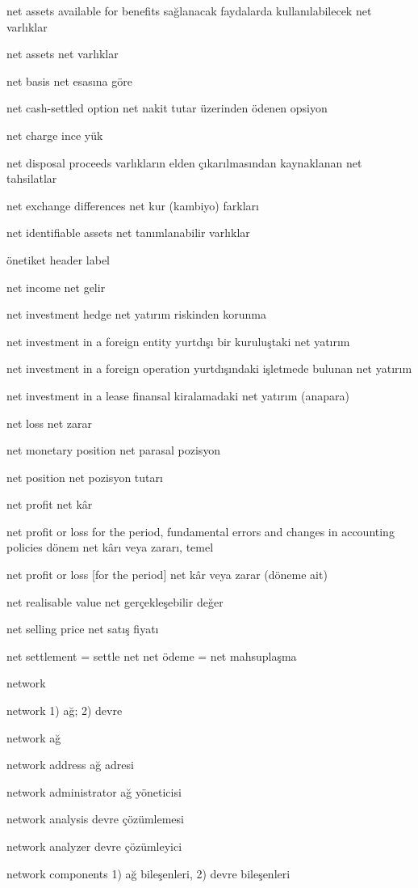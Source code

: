 \documentclass[12pt,fleqn]{article}\usepackage{../../common}
\begin{document}
net assets available for benefits sağlanacak faydalarda kullanılabilecek net varlıklar

net assets net varlıklar

net basis net esasına göre

net cash-settled option net nakit tutar üzerinden ödenen opsiyon

net charge ince yük

net disposal proceeds varlıkların elden çıkarılmasından kaynaklanan net tahsilatlar

net exchange differences net kur (kambiyo) farkları

net identifiable assets net tanımlanabilir varlıklar

önetiket header label

net income net gelir

net investment hedge net yatırım riskinden korunma

net investment in a foreign entity yurtdışı bir kuruluştaki net yatırım

net investment in a foreign operation yurtdışındaki işletmede bulunan net yatırım

net investment in a lease finansal kiralamadaki net yatırım (anapara)

net loss net zarar

net monetary position net parasal pozisyon

net position net pozisyon tutarı

net profit net kâr

net profit or loss for the period, fundamental errors and changes in accounting policies dönem net kârı veya zararı, temel

net profit or loss [for the period] net kâr veya zarar (döneme ait)

net realisable value net gerçekleşebilir değer

net selling price net satış fiyatı

net settlement = settle net net ödeme = net mahsuplaşma

network

network 1) ağ; 2) devre

network ağ

network address ağ adresi

network administrator ağ yöneticisi

network analysis devre çözümlemesi

network analyzer devre çözümleyici

network components 1) ağ bileşenleri, 2) devre bileşenleri
\end{document}
